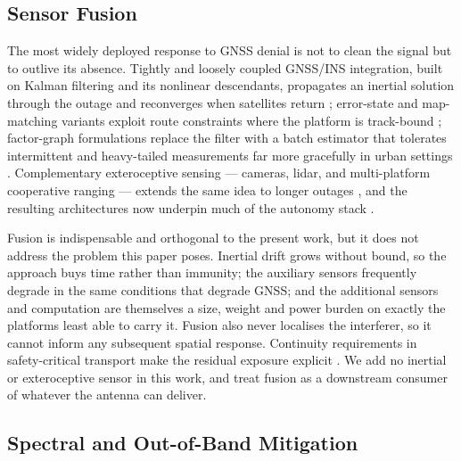 \documentclass[journal]{IEEEtran}
\begin{document}
\subsection{Sensor Fusion}
\label{sec:lit:fusion}

The most widely deployed response to GNSS denial is not to clean the signal but
to outlive its absence. Tightly and loosely coupled GNSS/INS integration, built
on Kalman filtering and its nonlinear descendants, propagates an inertial
solution through the outage and reconverges when satellites return
\cite{taghizadeh2023, Kaplan2017}; error-state and map-matching variants
exploit route constraints where the platform is track-bound \cite{liu2023};
factor-graph formulations replace the filter with a batch estimator that
tolerates intermittent and heavy-tailed measurements far more gracefully in
urban settings \cite{Wang2025}. Complementary exteroceptive sensing --- cameras,
lidar, and multi-platform cooperative ranging --- extends the same idea to
longer outages \cite{Chi2021, Matsuura2023, Liu2025, causa2025}, and the
resulting architectures now underpin much of the autonomy stack
\cite{Joubert2020}.

Fusion is indispensable and orthogonal to the present work, but it does not
address the problem this paper poses. Inertial drift grows without bound, so
the approach buys time rather than immunity; the auxiliary sensors frequently
degrade in the same conditions that degrade GNSS; and the additional sensors
and computation are themselves a size, weight and power burden on exactly the
platforms least able to carry it. Fusion also never localises the interferer,
so it cannot inform any subsequent spatial response. Continuity requirements in
safety-critical transport make the residual exposure explicit \cite{Filip2024,
ICAO2025}. We add no inertial or exteroceptive sensor in this work, and treat
fusion as a downstream consumer of whatever the antenna can deliver.

\subsection{Spectral and Out-of-Band Mitigation}
\label{sec:lit:spectral}
\end{document}
